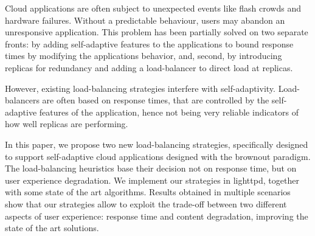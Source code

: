 Cloud applications are often subject to unexpected events like flash
crowds and hardware failures. Without a predictable behaviour, users
may abandon an unresponsive application.  This problem has been
partially solved on two separate fronts: by adding self-adaptive
features to the applications to bound response times by modifying the
applications behavior, and, second, by introducing replicas for
redundancy and adding a load-balancer to direct load at replicas.

However, existing load-balancing strategies interfere with
self-adaptivity. Load-balancers are often based on response times,
that are controlled by the self-adaptive features of the application,
hence not being very reliable indicators of how well replicas are
performing.

In this paper, we propose two new load-balancing strategies,
specifically designed to support self-adaptive cloud applications
designed with the brownout paradigm. The load-balancing heuristics
base their decision not on response time, but on user experience
degradation.  We implement our strategies in lighttpd, together with
some state of the art algorithms. Results obtained in multiple
scenarios show that our strategies allow to exploit the trade-off
between two different aspects of user experience: response time and
content degradation, improving the state of the art solutions.
